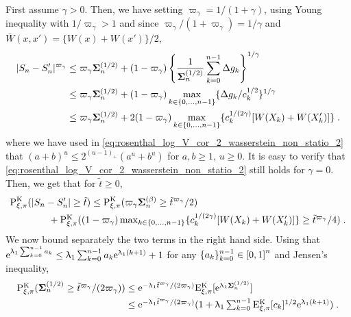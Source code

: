 First assume $\gamma >0$.
Then, we have setting $\varpi_{\gamma} = 1/(1+\gamma)$, using Young inequality with $1/\varpi_{\gamma} >1$ and since $\varpi_{\gamma}/(1+\varpi_{\gamma}) = 1/\gamma$ and $\bar{W}(x,x') = \{W(x) + W(x')\}/2$,
\begin{align}
  \nonumber
  |S_n-S_n'|^{\varpi_{\gamma}} &\leq \varpi_{\gamma} \boldsymbol{\Sigma}^{(1/2)}_n  +(1-\varpi_{\gamma}) \left\{ \frac{1}{\boldsymbol{\Sigma}^{(1/2)}_n} \sum_{k=0}^{n-1} \Delta g_k\right\}^{1/\gamma} \\
  \nonumber
                               & \leq \varpi_{\gamma} \boldsymbol{\Sigma}^{(1/2)}_n  +(1-\varpi_{\gamma})\max_{k\in\{0,\ldots,n-1\}}\{ \Delta g_k/c_k^{1/2} \}^{1/\gamma} \\
    \label{eq:rosenthal_log_V_cor_2_wasserstein_non_statio_2}
   & \leq \varpi_{\gamma} \boldsymbol{\Sigma}^{(1/2)}_n  +2 (1-\varpi_{\gamma}) \max_{k\in\{0,\ldots,n-1\}}\{ c_k^{1/(2\gamma)} [W(X_k)+ W(X_k')]\} \;.
\end{align}
where we have used in \eqref{eq:rosenthal_log_V_cor_2_wasserstein_non_statio_2} that $(a+b)^u \leq 2^{(u-1)_+}(a^u+b^u)$ for $a,b \geq 1$, $u \geq 0$. It is easy to verify that \eqref{eq:rosenthal_log_V_cor_2_wasserstein_non_statio_2} still holds for $\gamma =0$.
Then, we get that for $\tilde{t} \geq 0$,
\begin{align}
   \label{eq:rosenthal_log_V_cor_2_wasserstein_non_statio_2_5}
  &\mathrm{P}_{\xi,\pi}^{{\rm K}}(|S_n-S_n'| \geq \tilde{t}) \leq   \mathrm{P}_{\xi,\pi}^{{\rm K}}(\varpi_{\gamma} \boldsymbol{\Sigma}^{(\beta)}_n \geq \tilde{t}^{\varpi_{\gamma}}/2)\\
  \nonumber
&  \qquad \qquad \textstyle +   \mathrm{P}_{\xi,\pi}^{{\rm K}}( (1-\varpi_{\gamma}) \max_{k\in\{0,\ldots,n-1\}}\{ c_k^{1/(2\gamma)} [W(X_k)+ W(X_k')]\} \geq \tilde{t}^{\varpi_{\gamma}}/4) \;.
\end{align}
We now bound separately the two terms in the right hand side. Using that $\mathrm{e}^{\uplambda_1 \sum_{k=0}^{n-1}a_k} \leq \uplambda_1 \sum_{k=0}^{n-1} a_k \mathrm{e}^{\uplambda_1(k+1)} + 1$ for any $\{a_k\}_{k=0}^{n-1} \in\left[0,1\right]^n$ and Jensen's inequality, 
\begin{align*}
\txts  \PP_{\xi,\pi}^{\MKK}(\Sigmabf^{(1/2)}_n \geq \tilde{t}^{\varpi_{\gamma}}/(2\varpi_{\gamma})) &\leq \txts \rme^{- \uplambda_1 \tilde{t}^{\varpi_{\gamma}}/(2\varpi_{\gamma})}
                                                                                                \PE_{\xi,\pi}^{\MKK}[\rme^{\uplambda_1 \Sigmabf^{(1/2)}_n }] \\
                                 \txts                                            & \txts
  \leq \rme^{-\uplambda_1  \tilde{t}^{\varpi_{\gamma}}/(2\varpi_{\gamma})} (1+ \uplambda_1 \sum_{k=0}^{n-1} \PE_{\xi,\pi}^{\MKK}[  c_k]^{1/2} \rme^{\uplambda_1 (k+1)}) \eqsp.
\end{align*}
